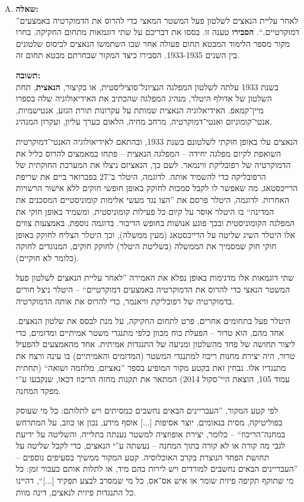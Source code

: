 \documentclass[a4paper]{article}
\newcommand\hl[1]   {#1}
\begin{document}
\begin{enumerate}[A.]
			\item \textbf{שאלה: }\\
			''לאחר עליית הנאצים לשלטון פעל המשטר המאצי כדי להרוס את הדמוקרטיה באמצעים דמוקרטיים.``. \textbf{הסבירו} טענה זו. בססו את דבריכם על שתי דוגמאות מתחום החקיקה. בחרו מקור מספר הלימוד המבטא תחום פעולה אחר שבו השתמשו הנאצים לביסוס שלטונים בין השנים 1933-1935. הסבירו כיצד המקור שבחרתם מבטא תחום זה. 
			
			\textbf{תשובה: }\\
			בשנת 1933 עלתה לשלטון המפלגה הנציונל־סוציליסטית, או בקיצור, \textbf{הנאצית}, תחת השלטון של \hl{אדולף היטלר}, מנהיג המפלגה שהכתיב את האידיאולוגיה שלה בספרו מיין־קמאפ. האידיאלוגיה הנאצית שמותת על עקרונות תורת הגזע, אנטישמיות, אנטי־קומוניזם ואנטי־דמוקרטיה, מרחב מחיה, הלאום כערך עליון, ועקרון המנהיג. 
			
			הנאצים עלו באופן חוקתי לשלטונם בשנת 1933, ובהתאם לאידיאולוגיה האנטי־דמוקרטית השואפת לקיום מפלגה יחידה – המפלגה הנאצית – פתחו במאמצים להרוס כליל את הדמוקרטיה של רפובליקת ווינמאר. לשם כך, הנאציזם ניצלו את המערכת החוקתית של הרפובליקה כדי להשמיד אותה. לדוגמה, היטלר ב־27 בפברואר ביים את שריפת הרייכסטאג, מה שאפשר לו לקבל סמכות לחוקק באופן חופשי חוקים ללא אישור הרשויות האחרות. לדוגמה, היטלר פרסם את ''הצו נגד מעשי אלימות קומוניסטיים המסכנים את המדינה`` בו היטלר אוסר על קיום כל פעילות קומוניסטית, ומשמיד באופן חוקי את המפלגה הקומוניסטית ובכך פוגע אנושות בחופש הדיבור. בדוגמה נוספת, באמצעות צווים אלו היטלר השיג שליטה על הרייכסטאג (מעין ממשלה), וכך היטלר הצליח לחוקק באופן חוקי חוק שמסמיך את הממשלה (בשליטת היטלר) לחוקק חוקים, המנוגדים לחוקה (כלומר לא חוקיים). 
			
			שתי דוגמאות אלו מדגימות באופן נפלא את האמירה ''לאחר עליית הנאצים לשלטון פעל המשטר הנאצי כדי להרוס את הדמוקרטיה באמצעים דמוקרטיים`` – היטלר ניצל חורים בדמוקרטיה של רפובליקת וויאנמר, כדי להרוס את אותה הדמוקרטיה. 
			
			היטלר פעל בתחומים אחרים, פרט לתחום החקיקה, על מנת לבסס את שלטון הנאצים. אחד מהם, הוא טרור – הפעלת כוח מכוון כלפי מתנגדי משטר אמיתיים ומדומים, כדי ליצור תחושה של פחד מהשלטון ומניעה של התנגדות אמיתית. אחד מהאמצעים להפעיל טרור, היה יצירת מחנות ריכוז למתנגדי המשטר (המדומים והאמיתיים) בו עינה ורצח את מתנגדיו אלו. נבחין זאת בקטע מקור המופיע בספר ''נאציזם, מלחמה ושואה`` (תחתית עמוד 105, הוצאת היי־סקול 2014) המתאר את תקנות מחזה הריכוז דכאו, שנקבעו ע''י מפקד המחנה.
			
			לפי קטע המקור, ''העבריינים הבאים נחשבים כמסיתים ויש לתלותם: כל מי שעוסק בפוליטיקה, מסית בנאומים, יוצר אסיפות [...] אוסף מידע, נכון או כוזב, על המתרחש במחנה־הריכוז`` – כלומר, יצירת אופוזציה למשטר נענתה בתלייה, והשליטה על ידיעת לגבי מה קורה או לא קורה בתוך המחנה – נעשתה ע''י הנאצים, כדי לקבל שליטה על תחושת הפחד הנוצרת בקרב האוכלוסיה. קטע המקור ממשיך בסעיפים נוספים – ''העבריינים הבאים נחשבים למורדים ויש לירות בהם מיד, או לתלות אותם כעבור זמן: כל מי שתוקף תקיפה פיזית שומר או איש אס־אס, כל מי שמסרב לבצע תפקיד [...]``, דהיינו כל התנגדות פיזית לנאצים, דינה מוות. 
			
		\end{enumerate}
		
\end{document}
